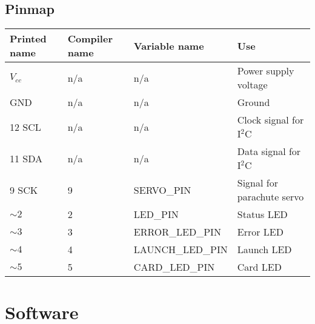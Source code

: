 \documentclass{article}
\begin{document}
\subsection*{Pinmap}
\begin{table}[H]
\begin{tabular}{llll}
Printed name & Compiler name & Variable name & Use \\
\hline
$V_{cc}$ & n/a & n/a & Power supply voltage \\
GND & n/a & n/a & Ground \\
12 SCL & n/a & n/a & Clock signal for I$^2$C \\
11 SDA & n/a & n/a & Data signal for I$^2$C \\
9 SCK & 9 & SERVO\_PIN & Signal for parachute servo \\
$\sim2$ & 2 & LED\_PIN & Status LED \\
$\sim3$ & 3 & ERROR\_LED\_PIN & Error LED \\
$\sim4$ & 4 & LAUNCH\_LED\_PIN & Launch LED \\
$\sim5$ & 5 & CARD\_LED\_PIN & Card LED \\

\end{tabular}
\end{table}

\section*{Software}
\end{document}
